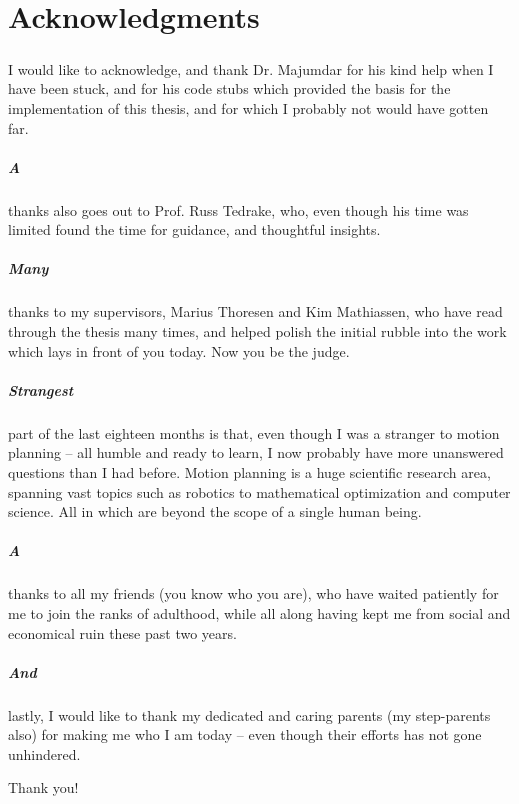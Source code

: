 \chapter{Acknowledgments}

\paragraph{} I would like to acknowledge, and thank Dr. Majumdar for his kind help when I
have been stuck, and for his code stubs which provided the basis for the
implementation of this thesis, and for which I probably not would have gotten
far.

\paragraph{A} thanks also goes out to Prof. Russ Tedrake, who, even though his time was
limited found the time for guidance, and thoughtful insights.

\paragraph{Many} thanks to my supervisors, Marius Thoresen and Kim Mathiassen, who have read
through the thesis many times, and helped polish the initial rubble into the
work which lays in front of you today. Now you be the judge.

\paragraph{Strangest} part of the last eighteen months is that, even though I was a stranger
to motion planning -- all humble and ready to learn, I now probably have more
unanswered questions than I had before. Motion planning is a huge scientific
research area, spanning vast topics such as robotics to mathematical optimization
and computer science. All in which are beyond the scope of a single human being.

\paragraph{A} thanks to all my friends (you know who you are), who have waited patiently for
me to join the ranks of adulthood, while all along having kept me from social
and economical ruin these past two years.

\paragraph{And} lastly, I would like to thank my dedicated and caring parents (my
step-parents also) for making me who I am today -- even though their efforts has
not gone unhindered.

Thank you!
